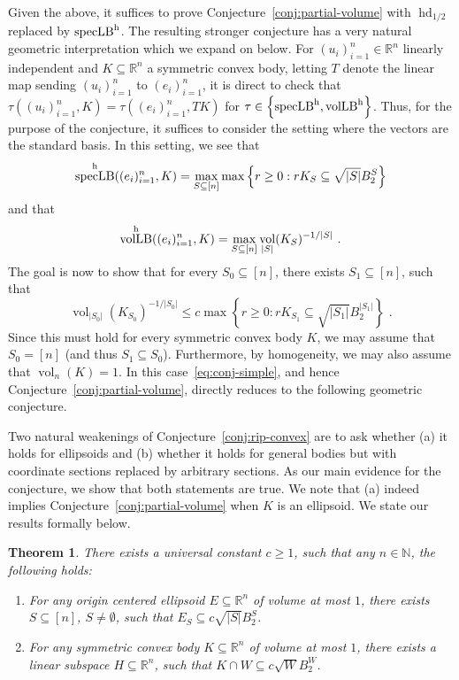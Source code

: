 \documentclass[11pt]{article}
\newtheorem{theorem}{Theorem}
\newtheorem{conjecture}[theorem]{Conjecture}
\newcommand{\R}{{\mathbb{R}}}
\newcommand{\N}{{\mathbb{N}}}
\newcommand{\set}[1]{\left\{ #1 \right\}}
\DeclareMathOperator{\vollb}{volLB}
\DeclareMathOperator{\hd}{hd}
\DeclareMathOperator{\vol}{vol}
\DeclareMathOperator{\speclb}{specLB}
\begin{document}
Given the above, it suffices to prove Conjecture~\ref{conj:partial-volume} with
$\hd_{1/2}$ replaced by $\speclb^{\rm h}$. The resulting stronger conjecture has a
very natural geometric interpretation which we expand on below. For
$(u_i)_{i=1}^n \in \R^n$ linearly independent and $K \subseteq \R^n$ a symmetric
convex body, letting $T$ denote the linear map sending $(u_i)_{i=1}^n$ to
$(e_i)_{i=1}^n$, it is direct to check that $\tau((u_i)_{i=1}^n,K) =
\tau((e_i)_{i=1}^n,TK)$ for $\tau \in \set{\speclb^{\rm h},\vollb^{\rm h}}$.
Thus, for the purpose of the conjecture, it suffices to consider the setting
where the vectors are the standard basis. In this setting, we see that
\[
\speclb^{\rm h}((e_i)_{i=1}^n,K) = \max_{S \subseteq [n]} \max \set{r \geq
0: r K_S \subseteq \sqrt{|S|} B_2^S} 
\]
and that 
\[
\vollb^{\rm h}((e_i)_{i=1}^n,K) = \max_{S \subseteq [n]}
\vol_{|S|}(K_S)^{-1/|S|} \text{ .} 
\]
The goal is now to show that for every $S_0 \subseteq [n]$, there exists $S_1
\subseteq [n]$, such that 
\begin{equation}
\label{eq:conj-simple}
\vol_{|S_0|}(K_{S_0})^{-1/|S_0|} \leq c \max \set{r \geq 0: r K_{S_1} \subseteq
\sqrt{|S_1|} B_2^{|S_1|}} \text{ .}
\end{equation}
Since this must hold for every symmetric convex body $K$, we may assume that
$S_0 = [n]$ (and thus $S_1 \subseteq S_0$). Furthermore, by homogeneity, we may
also assume that $\vol_n(K)=1$. In this case~\eqref{eq:conj-simple}, and hence
Conjecture~\ref{conj:partial-volume}, directly reduces to the following
geometric conjecture.

\ripconvex*

Two natural weakenings of Conjecture~\ref{conj:rip-convex} are to ask whether
(a) it holds for ellipsoids and (b) whether it holds for general bodies but with
coordinate sections replaced by arbitrary sections. As our main evidence for the
conjecture, we show that both statements are true. We note that (a) indeed
implies Conjecture~\ref{conj:partial-volume} when $K$ is an ellipsoid. We state
our results formally below.

\begin{theorem}
\label{thm:partial-conjecture}
There exists a universal constant $c \geq 1$, such that any $n \in \N$, the
following holds:
\begin{enumerate}
\item For any origin centered ellipsoid $E \subseteq \R^n$ of volume at most
$1$, there exists $S \subseteq [n]$, $S \neq \emptyset$, such that $E_S
\subseteq c \sqrt{|S|} B_2^S$.
\item For any symmetric convex body $K \subseteq \R^n$ of volume at most $1$,
there exists a linear subspace $H \subseteq \R^n$, such that $K \cap W \subseteq
c \sqrt{W} B_2^W$.
\end{enumerate}
\end{theorem}
\end{document}

